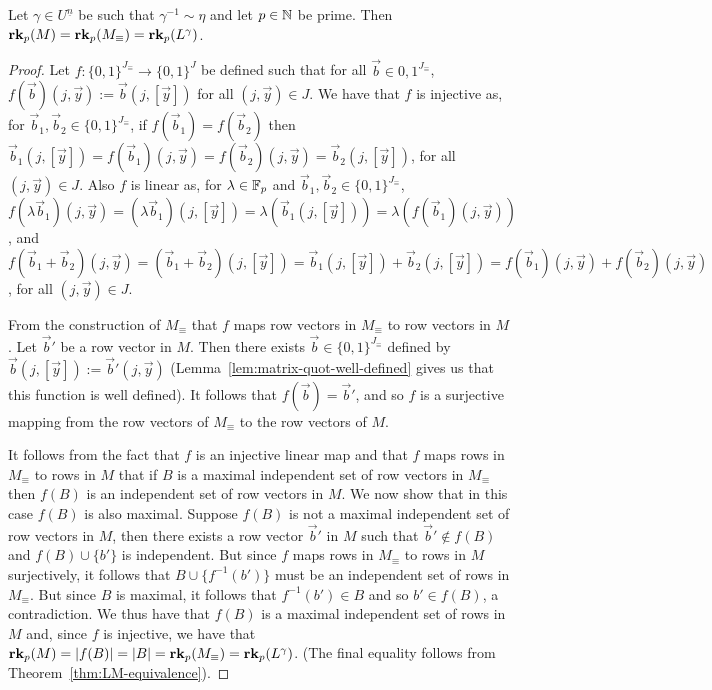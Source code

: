 \documentclass[../paper.tex]{subfiles}
\begin{document}
\begin{lem}
	Let $\gamma \in U^{\underline{n}}$ be such that $\gamma^{-1} \sim \eta$ and
  let $p \in \mathbb{N}$ be prime. Then $\text{\textbf{rk}}_p (M) = \text{\textbf{rk}}_p (M_\equiv) = \text{\textbf{rk}}_p
  (L^{\gamma})$.
  \label{lem:rank-triple-equivilence}
\end{lem}
\begin{proof}
	Let $f : \{0,1\}^{J_\equiv} \rightarrow \{0,1\}^{J}$ be defined such that for
  all $\vec{b} \in {0,1}^{J_\equiv}$, $f(\vec{b}) (j, \vec{y}) := \vec{b}(j,
  [\vec{y}])$ for all $(j, \vec{y}) \in J$. We have that $f$ is injective as,
  for $\vec{b}_1, \vec{b}_2 \in \{0,1\}^{J_\equiv}$, if $f(\vec{b}_1) =
  f(\vec{b}_2)$ then $\vec{b}_1 (j, [\vec{y}]) = f(\vec{b}_1)(j, \vec{y}) =
  f(\vec{b}_2)(j, \vec{y}) = \vec{b}_2(j, [\vec{y}])$, for all $(j, \vec{y}) \in
  J$. Also $f$ is linear as, for $\lambda \in \mathbb{F}_p$ and $\vec{b}_1, \vec{b}_2
  \in \{0,1\}^{J_\equiv}$, $f(\lambda \vec{b}_1) (j, \vec{y}) = (\lambda
  \vec{b}_1)(j, [\vec{y}]) = \lambda (\vec{b}_1 (j, [\vec{y}])) = \lambda (f(
  \vec{b}_1) (j, \vec{y}))$, and $ f(\vec{b}_1 + \vec{b}_2) (j, \vec{y}) =
  (\vec{b}_1 + \vec{b}_2) (j, [\vec{y}]) = \vec{b}_1(j, [\vec{y}]) +
  \vec{b}_2(j, [\vec{y}]) = f(\vec{b}_1)(j, \vec{y}) + f(\vec{b}_2)(j,
  \vec{y})$, for all $(j, \vec{y}) \in J$.
		
	From the construction of $M_\equiv$ that $f$ maps row vectors in $M_\equiv$ to
  row vectors in $M$. Let $\vec{b}'$ be a row vector in $M$. Then there exists
  $\vec{b} \in \{0,1\}^{J_\equiv}$ defined by $\vec{b} (j, [\vec{y}]) :=
  \vec{b}' (j, \vec{y})$ (Lemma~\ref{lem:matrix-quot-well-defined} gives us that
  this function is well defined). It follows that $f(\vec{b}) = \vec{b}'$, and
  so $f$ is a surjective mapping from the row vectors of $M_\equiv$ to the row
  vectors of $M$.
		
	It follows from the fact that $f$ is an injective linear map and that $f$ maps
  rows in $M_\equiv$ to rows in $M$ that if $B$ is a maximal independent set of
  row vectors in $M_\equiv$ then $f(B)$ is an independent set of row vectors in
  $M$. We now show that in this case $f(B)$ is also maximal. Suppose $f(B)$ is
  not a maximal independent set of row vectors in $M$, then there exists a row
  vector $\vec{b}'$ in $M$ such that $\vec{b}' \notin f(B)$ and $f(B) \cup
  \{b'\}$ is independent. But since $f$ maps rows in $M_\equiv$ to rows in $M$
  surjectively, it follows that $B \cup \{f^{-1}(b') \}$ must be an independent
  set of rows in $M_\equiv$. But since $B$ is maximal, it follows that
  $f^{-1}(b') \in B$ and so $b' \in f(B)$, a contradiction. We thus have that
  $f(B)$ is a maximal independent set of rows in $M$ and, since $f$ is
  injective, we have that $\text{\textbf{rk}}_p (M) = \vert f(B) \vert = \vert B \vert =
  \text{\textbf{rk}}_p (M_\equiv) = \text{\textbf{rk}}_p(L^{\gamma})$. (The final equality follows from
  Theorem~\ref{thm:LM-equivalence}).
\end{proof}
\end{document}

